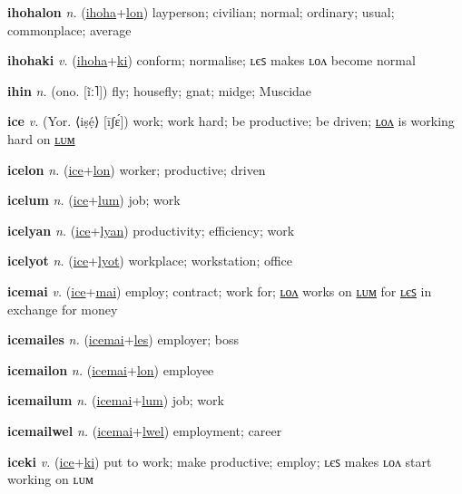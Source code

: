 \textbf{\hypertarget{ihohalon}{ihohalon}} \textit{n.} (\hyperlink{ihoha}{ihoha}+\allowbreak \hyperlink{lon}{lon})
layperson; civilian; normal; ordinary; usual; commonplace; average

\textbf{\hypertarget{ihohaki}{ihohaki}} \textit{v.} (\hyperlink{ihoha}{ihoha}+\allowbreak \hyperlink{ki}{ki})
conform; normalise; ʟєꜱ makes ʟᴏᴧ become normal

\textbf{\hypertarget{ihin}{ihin}} \textit{n.} (ono. [ĩː˥])
fly; housefly; gnat; midge; Muscidae

\textbf{\hypertarget{ice}{ice}} \textit{v.} (Yor. ⟨iṣẹ́⟩ [īʃɛ́])
work; work hard; be productive; be driven; \hyperlink{icelon}{ʟᴏᴧ} is working hard on \hyperlink{icelum}{ʟᴜᴍ}

\textbf{\hypertarget{icelon}{icelon}} \textit{n.} (\hyperlink{ice}{ice}+\allowbreak \hyperlink{lon}{lon})
worker; productive; driven

\textbf{\hypertarget{icelum}{icelum}} \textit{n.} (\hyperlink{ice}{ice}+\allowbreak \hyperlink{lum}{lum})
job; work

\textbf{\hypertarget{icelyan}{icelyan}} \textit{n.} (\hyperlink{ice}{ice}+\allowbreak \hyperlink{lyan}{lyan})
productivity; efficiency; work

\textbf{\hypertarget{icelyot}{icelyot}} \textit{n.} (\hyperlink{ice}{ice}+\allowbreak \hyperlink{lyot}{lyot})
workplace; workstation; office

\textbf{\hypertarget{icemai}{icemai}} \textit{v.} (\hyperlink{ice}{ice}+\allowbreak \hyperlink{mai}{mai})
employ; contract; work for; \hyperlink{icemailon}{ʟᴏᴧ} works on \hyperlink{icemailum}{ʟᴜᴍ} for \hyperlink{icemailes}{ʟєꜱ} in exchange for money

\textbf{\hypertarget{icemailes}{icemailes}} \textit{n.} (\hyperlink{icemai}{icemai}+\allowbreak \hyperlink{les}{les})
employer; boss

\textbf{\hypertarget{icemailon}{icemailon}} \textit{n.} (\hyperlink{icemai}{icemai}+\allowbreak \hyperlink{lon}{lon})
employee

\textbf{\hypertarget{icemailum}{icemailum}} \textit{n.} (\hyperlink{icemai}{icemai}+\allowbreak \hyperlink{lum}{lum})
job; work

\textbf{\hypertarget{icemailwel}{icemailwel}} \textit{n.} (\hyperlink{icemai}{icemai}+\allowbreak \hyperlink{lwel}{lwel})
employment; career

\textbf{\hypertarget{iceki}{iceki}} \textit{v.} (\hyperlink{ice}{ice}+\allowbreak \hyperlink{ki}{ki})
put to work; make productive; employ; ʟєꜱ makes ʟᴏᴧ start working on ʟᴜᴍ

